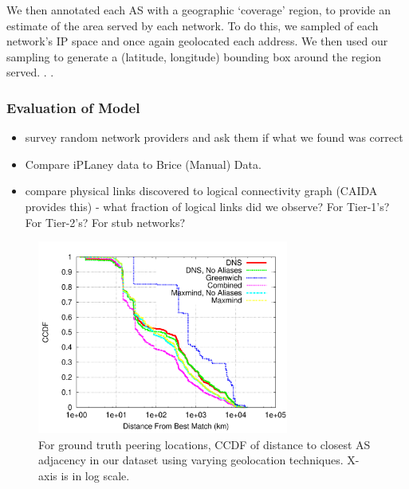     We then annotated each AS with a geographic `coverage' region, to provide
an estimate of the area served by each network. 
    To do this, we sampled  of each network's IP space and
once again geolocated each address. 
    We then used our sampling to generate a (latitude, longitude) bounding box
around the region served.    
    .
    .
 
        \subsubsection*{Evaluation of Model}
            \begin{itemize}
        \item survey random network providers and ask them if what we
        found was correct
        \item Compare iPLaney data to Brice (Manual) Data.
        \item compare physical links discovered to logical connectivity
        graph (CAIDA provides this) - what fraction of logical links
        did we observe? For Tier-1's? For Tier-2's? For stub networks?
            \end{itemize} 

\begin{figure}[tb]
\centering
\includegraphics[width=3.25in]{graph_all_match_ccdf}
\caption[]{For ground truth peering locations, CCDF of distance to closest AS adjacency in our dataset using varying geolocation techniques. X-axis is in log scale.} 
\end{figure}


